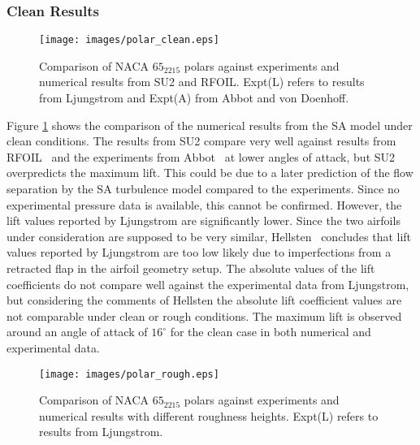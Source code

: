 \subsubsection{Clean Results}
\begin{figure}[h!]
    \centering
    \texttt{[image: images/polar\_clean.eps]}
    \caption{Comparison of NACA $65_2215$ polars against experiments and numerical results from SU2 and RFOIL. Expt(L) refers to results from Ljungstrom and Expt(A) from Abbot and von Doenhoff\cite{abbott2012theory}.}
    \label{fig:n652215cmp}
\end{figure}
Figure \ref{fig:n652215cmp} shows the comparison of the numerical results from the SA model under clean conditions. %
The results from SU2 compare very well against results from RFOIL~\cite{rfoil_orig} and the experiments from Abbot~\cite{abbott2012theory} at lower angles of attack, but SU2 overpredicts the maximum lift. This could be due to a later prediction of the flow separation by the SA turbulence model compared to the experiments. 
Since no experimental pressure data is available, this cannot be confirmed. However, the lift values reported by Ljungstrom are significantly lower. Since the two airfoils under consideration are supposed to be very similar, Hellsten~\cite{hellsten1997extension} concludes that lift values reported by Ljungstrom are too low likely due to imperfections from a retracted flap in the airfoil geometry setup. The absolute values of the lift coefficients do not compare well against the experimental data from Ljungstrom, but considering the comments of Hellsten the absolute lift coefficient values are not comparable under clean or rough conditions. The maximum lift is observed around an angle of attack of $16^\circ$ for the clean case in both numerical and experimental data. 
\begin{figure}[h!]
    \centering
    \texttt{[image: images/polar\_rough.eps]}
    \caption{Comparison of NACA $65_2215$ polars against experiments and numerical results with different roughness heights. Expt(L) refers to results from Ljungstrom.}
    \label{fig:n652215rgh}
\end{figure}
